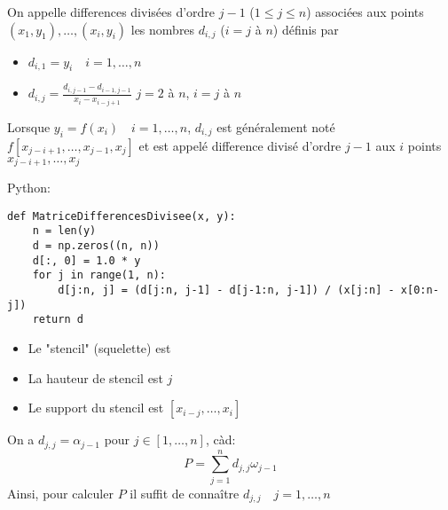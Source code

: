 \begin{definition}
    On appelle differences divisées d'ordre $j-1$ ($1 \le j \le n$) associées aux points $(x_1, y_1), \ldots, (x_i, y_i)$ les nombres $d_{i, j}$ ($i = j$ à $n$) définis par
    \begin{itemize}
        \item $d_{i, 1} = y_i \quad i = 1, \ldots, n$
        \item $d_{i, j} = \frac{d_{i, j-1} - d_{i-1,j-1}}{x_i - x_{i - j + 1}}$ \quad $j = 2$ à $n$, $i = j$ à $n$
    \end{itemize}
    Lorsque $y_i = f(x_i) \quad i = 1, \ldots, n$, $d_{i, j}$  est généralement noté $f[x_{j-i+1}, \ldots, x_{j-1}, x_j]$ et est appelé difference divisé d'ordre $j-1$ aux  $i$ points  $x_{j - i + 1}, \ldots, x_j$
\end{definition}
Python:
\begin{lstlisting}
def MatriceDifferencesDivisee(x, y):
    n = len(y)
    d = np.zeros((n, n))
    d[:, 0] = 1.0 * y
    for j in range(1, n):
        d[j:n, j] = (d[j:n, j-1] - d[j-1:n, j-1]) / (x[j:n] - x[0:n-j])
    return d
\end{lstlisting}
\begin{remark}
   \begin{itemize}
       \item Le "stencil" (squelette) est
           \begin{center}
           \end{center}
        \item La hauteur de stencil est $j$
        \item Le support du stencil est  $[x_{i-j}, \ldots, x_{i}]$
   \end{itemize} 
\end{remark}
\begin{prop}
    On a $d_{j,j} = \alpha_{j-1}$  pour $j \in [1, \ldots, n]$, càd:
    \[
    P = \sum_{j=1}^{n} d_{j,j}\omega_{j-1}
    \] 
    Ainsi, pour calculer $P$ il suffit de connaître  $d_{j, j} \quad j = 1, \ldots, n$
\end{prop}

